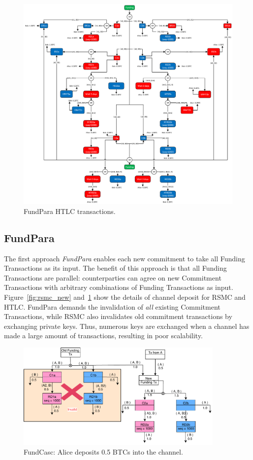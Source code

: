\begin{figure}[H]
\centering
\includegraphics[width=6in]{figs/htlc_new.pdf}
\vspace{-6pt}
\caption{FundPara HTLC transactions.}
\label{fig:htlc_new}
\end{figure}

\subsection{FundPara}


The first approach {\em FundPara} enables each new commitment to take all Funding Transactions as its input. The benefit of this approach is that all Funding Transactions are parallel: counterparties can agree on new Commitment
Transactions with arbitrary combinations of Funding Transactions as input.
Figure~\ref{fig:rsmc_new} and~\ref{fig:htlc_new} show the details of channel
deposit for RSMC and HTLC. FundPara demands the invalidation of {\em all} existing Commitment Transactions, while RSMC also invalidates old commitment transactions by exchanging private keys. Thus, numerous keys are exchanged when a channel has made a large amount of transactions, resulting in poor scalability.

\begin{figure}[H]
\centering
\includegraphics[width=4in]{figs/splice_in.pdf}
\vspace{-6pt}
\caption{FundCasc: Alice deposits 0.5 BTCs into the channel.}
\label{fig:splice_in}
\end{figure}

